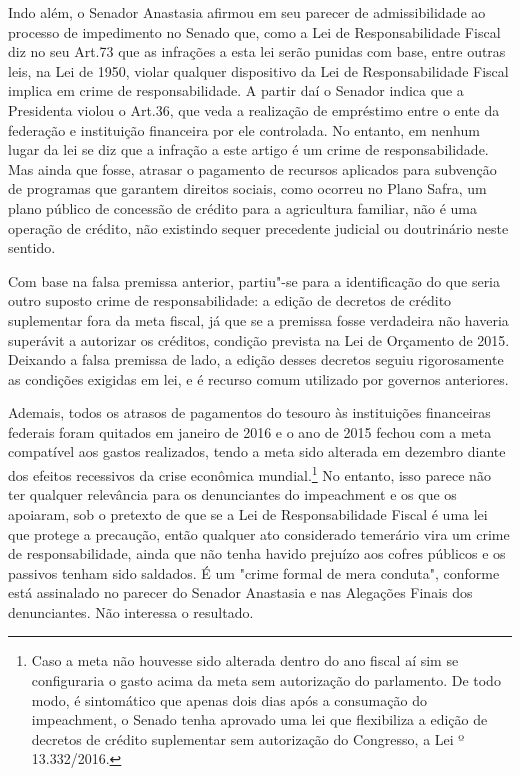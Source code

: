 Indo além, o Senador Anastasia afirmou em seu parecer de admissibilidade
ao processo de impedimento no Senado que, como a Lei de Responsabilidade
Fiscal diz no seu Art.73 que as infrações a esta lei serão punidas com
base, entre outras leis, na Lei de 1950, violar qualquer dispositivo da
Lei de Responsabilidade Fiscal implica em crime de responsabilidade. A
partir daí o Senador indica que a Presidenta violou o Art.36, que veda a
realização de empréstimo entre o ente da federação e instituição
financeira por ele controlada. No entanto, em nenhum lugar da lei se diz
que a infração a este artigo é um crime de responsabilidade. Mas ainda
que fosse, atrasar o pagamento de recursos aplicados para subvenção de
programas que garantem direitos sociais, como ocorreu no Plano Safra, um
plano público de concessão de crédito para a agricultura familiar, não é
uma operação de crédito, não existindo sequer precedente judicial ou
doutrinário neste sentido.

Com base na falsa premissa anterior, partiu"-se para a identificação do
que seria outro suposto crime de responsabilidade: a edição de decretos
de crédito suplementar fora da meta fiscal, já que se a premissa fosse
verdadeira não haveria superávit a autorizar os créditos, condição
prevista na Lei de Orçamento de 2015. Deixando a falsa premissa de lado,
a edição desses decretos seguiu rigorosamente as condições exigidas em
lei, e é recurso comum utilizado por governos anteriores.

Ademais, todos os atrasos de pagamentos do tesouro às instituições
financeiras federais foram quitados em janeiro de 2016 e o ano de 2015
fechou com a meta compatível aos gastos realizados, tendo a meta sido
alterada em dezembro diante dos efeitos recessivos da crise econômica
mundial.\footnote{Caso a meta não houvesse sido alterada dentro do ano
  fiscal aí sim se configuraria o gasto acima da meta sem autorização do
  parlamento. De todo modo, é sintomático que apenas dois dias após a
  consumação do impeachment, o Senado tenha aprovado uma lei que
  flexibiliza a edição de decretos de crédito suplementar sem
  autorização do Congresso, a Lei º 13.332/2016.} No entanto, isso
parece não ter qualquer relevância para os denunciantes do impeachment e
os que os apoiaram, sob o pretexto de que se a Lei de Responsabilidade
Fiscal é uma lei que protege a precaução, então qualquer ato considerado
temerário vira um crime de responsabilidade, ainda que não tenha havido
prejuízo aos cofres públicos e os passivos tenham sido saldados. É um
"crime formal de mera conduta", conforme está assinalado no parecer do
Senador Anastasia e nas Alegações Finais dos denunciantes. Não interessa
o resultado.


